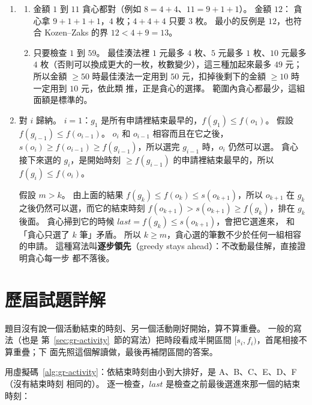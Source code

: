 \begin{enumerate}
\item
\begin{enumerate}
\item 金額 $1$ 到 $11$ 貪心都對（例如 $8 = 4 + 4$、$11 = 9 + 1 + 1$）。 金額 $12$：
貪心拿 $9 + 1 + 1 + 1$，$4$ 枚；$4 + 4 + 4$ 只要 $3$ 枚。 最小的反例是 $12$，也符合
Kozen--Zaks 的界 $12 < 4 + 9 = 13$。
\item 只要檢查 $1$ 到 $59$。 最佳湊法裡 $1$ 元最多 $4$ 枚、$5$ 元最多 $1$ 枚、$10$ 元最多
$4$ 枚（否則可以換成更大的一枚，枚數變少），這三種加起來最多 $49$ 元；所以金額
$\ge 50$ 時最佳湊法一定用到 $50$ 元，扣掉後剩下的金額 $\ge 10$ 時一定用到 $10$ 元，依此類
推，正是貪心的選擇。 範圍內貪心都最少，這組面額是標準的。
\end{enumerate}

\item 對 $i$ 歸納。 $i = 1$：$g_1$ 是所有申請裡結束最早的，$f(g_1) \le f(o_1)$。 假設
$f(g_{i-1}) \le f(o_{i-1})$。 $o_i$ 和 $o_{i-1}$ 相容而且在它之後，
$s(o_i) \ge f(o_{i-1}) \ge f(g_{i-1})$，所以選完 $g_{i-1}$ 時，$o_i$ 仍然可以選。 貪心
接下來選的 $g_i$，是開始時刻 $\ge f(g_{i-1})$ 的申請裡結束最早的，所以
$f(g_i) \le f(o_i)$。

假設 $m > k$。 由上面的結果 $f(g_k) \le f(o_k) \le s(o_{k+1})$，所以 $o_{k+1}$ 在
$g_k$ 之後仍然可以選，而它的結束時刻 $f(o_{k+1}) > s(o_{k+1}) \ge f(g_k)$，排在
$g_k$ 後面。 貪心掃到它的時候 $\mathit{last} = f(g_k) \le s(o_{k+1})$，會把它選進來，
和「貪心只選了 $k$ 筆」矛盾。 所以 $k \ge m$，貪心選的筆數不少於任何一組相容的申請。
這種寫法叫\textbf{逐步領先}（greedy stays ahead）：不改動最佳解，直接證明貪心每一步
都不落後。

\end{enumerate}

\section*{歷屆試題詳解}

題目沒有說一個活動結束的時刻、另一個活動剛好開始，算不算重疊。 一般的寫法（也是
第~\ref{sec:gr-activity}~節的寫法）把時段看成半開區間 $[s_i, f_i)$，首尾相接不算重疊；下
面先照這個解讀做，最後再補閉區間的答案。

用虛擬碼~\ref{alg:gr-activity}：依結束時刻由小到大排好，是 A、B、C、E、D、F（沒有結束時刻
相同的）。 逐一檢查，$\mathit{last}$ 是檢查之前最後選進來那一個的結束時刻：

